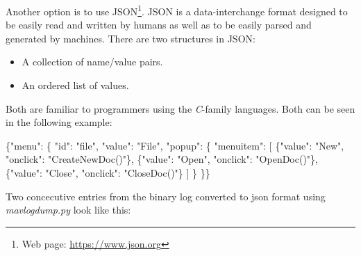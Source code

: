\documentclass[12pt,oneside]{reedthesis}
\newenvironment{Shaded}{\begin{snugshade}}{\end{snugshade}}
\newcommand{\DataTypeTok}[1]{\textcolor[rgb]{0.13,0.29,0.53}{#1}}
\newcommand{\StringTok}[1]{\textcolor[rgb]{0.31,0.60,0.02}{#1}}
\newcommand{\OtherTok}[1]{\textcolor[rgb]{0.56,0.35,0.01}{#1}}
\newcommand{\FunctionTok}[1]{\textcolor[rgb]{0.00,0.00,0.00}{#1}}
\theoremstyle{definition}
\theoremstyle{definition}
\theoremstyle{definition}
\theoremstyle{remark}
\begin{document}
Another option is to use JSON\footnote{Web page:
  \url{https://www.json.org}}. JSON is a data-interchange format
designed to be easily read and written by humans as well as to be easily
parsed and generated by machines. There are two structures in JSON:
\begin{itemize}
\item
  A collection of name/value pairs.
\item
  An ordered list of values.
\end{itemize}
Both are familiar to programmers using the \emph{C}-family languages.
Both can be seen in the following example:
\begin{Shaded}
\begin{Highlighting}[]
\FunctionTok{\{}\DataTypeTok{"menu"}\FunctionTok{:} \FunctionTok{\{}
  \DataTypeTok{"id"}\FunctionTok{:} \StringTok{"file"}\FunctionTok{,}
  \DataTypeTok{"value"}\FunctionTok{:} \StringTok{"File"}\FunctionTok{,}
  \DataTypeTok{"popup"}\FunctionTok{:} \FunctionTok{\{}
    \DataTypeTok{"menuitem"}\FunctionTok{:} \OtherTok{[}
      \FunctionTok{\{}\DataTypeTok{"value"}\FunctionTok{:} \StringTok{"New"}\FunctionTok{,} \DataTypeTok{"onclick"}\FunctionTok{:} \StringTok{"CreateNewDoc()"}\FunctionTok{\}}\OtherTok{,}
      \FunctionTok{\{}\DataTypeTok{"value"}\FunctionTok{:} \StringTok{"Open"}\FunctionTok{,} \DataTypeTok{"onclick"}\FunctionTok{:} \StringTok{"OpenDoc()"}\FunctionTok{\}}\OtherTok{,}
      \FunctionTok{\{}\DataTypeTok{"value"}\FunctionTok{:} \StringTok{"Close"}\FunctionTok{,} \DataTypeTok{"onclick"}\FunctionTok{:} \StringTok{"CloseDoc()"}\FunctionTok{\}}
    \OtherTok{]}
  \FunctionTok{\}}
\FunctionTok{\}\}}
\end{Highlighting}
\end{Shaded}
Two concecutive entries from the binary log converted to json format
using \emph{mavlogdump.py} look like this:
\end{document}
